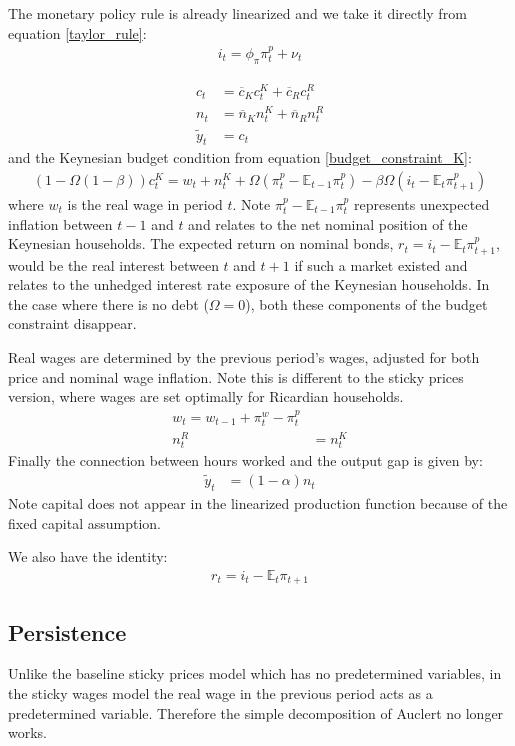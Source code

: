 \documentclass[titlepage]{\econtex}\newcommand{\texname}{ConsumptionHeterogeneity}
\begin{document}
The monetary policy rule is already linearized and we take it directly from equation \ref{taylor_rule}:
\begin{align}
i_t = \phi_{\pi} \pi^p_t + \nu_t	
\end{align}

\begin{align}
c_t &= \overline{c}_{K} c^K_t + \overline{c}_{R} c^R_t  \\
n_t &= \overline{n}_{K} n^K_t + \overline{n}_{R} n^R_t  \\
\tilde{y}_t &= c_t 
\end{align}
and the Keynesian budget condition from equation \ref{budget_constraint_K}:
\begin{align}
(1-\Omega (1-\beta)) c^K_t = w_t + n^K_t + \Omega \left(\pi^p_t - \mathbb{E}_{t-1}\pi^p_t\right) - \beta \Omega  (i_t - \mathbb{E}_t \pi^p_{t+1})  \end{align}
where $w_t$ is the real wage in period $t$. Note $\pi^p_t - \mathbb{E}_{t-1}\pi^p_t$ represents unexpected inflation between $t-1$ and $t$ and relates to the net nominal position of the Keynesian households. The expected return on nominal bonds, $r_t = i_t - \mathbb{E}_t \pi^p_{t+1}$, would be the real interest between $t$ and $t+1$ if such a market existed and relates to the unhedged interest rate exposure of the Keynesian households. In the case where there is no debt ($\Omega=0$), both these components of the budget constraint disappear. 

Real wages are determined by the previous period's wages, adjusted for both price and nominal wage inflation. Note this is different to the sticky prices version, where wages are set optimally for Ricardian households.
\begin{align}
w_t = w_{t-1} + \pi^w_t - \pi^p_t \\
n^R_t &= n^K_t
\end{align}
Finally the connection between hours worked and the output gap is given by:
\begin{align}
\tilde{y}_t &= (1-\alpha)n_t  
\end{align}
Note capital does not appear in the linearized production function because of the fixed capital assumption.

We also have the identity:
\begin{align}
r_t = i_t - \mathbb{E}_t \pi_{t+1}
\end{align}

\subsection{Persistence}
Unlike the baseline sticky prices model which has no predetermined variables, in the sticky wages model the real wage in the previous period acts as a predetermined variable. Therefore the simple decomposition of Auclert no longer works.
\end{document}
